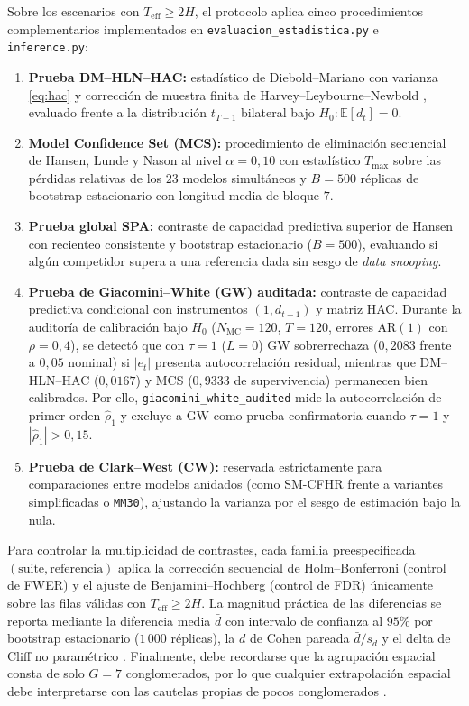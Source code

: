 Sobre los escenarios con $T_{\mathrm{eff}} \ge 2H$, el protocolo aplica cinco procedimientos complementarios implementados en \texttt{evaluacion\_estadistica.py} e \texttt{inference.py}:
\begin{enumerate}
    \item \textbf{Prueba DM--HLN--HAC:} estadístico de Diebold--Mariano \cite{diebold1995} con varianza \eqref{eq:hac} y corrección de muestra finita de Harvey--Leybourne--Newbold \cite{harvey1997}, evaluado frente a la distribución $t_{T-1}$ bilateral bajo $H_0 : \mathbb{E}[d_t] = 0$.
    \item \textbf{Model Confidence Set (MCS):} procedimiento de eliminación secuencial de Hansen, Lunde y Nason \cite{hansen2011mcs} al nivel $\alpha = 0{,}10$ con estadístico $T_{\max}$ sobre las pérdidas relativas de los $23$ modelos simultáneos y $B=500$ réplicas de bootstrap estacionario \cite{politis1994stationary} con longitud media de bloque $7$.
    \item \textbf{Prueba global SPA:} contraste de capacidad predictiva superior de Hansen \cite{hansen2005spa} con recienteo consistente y bootstrap estacionario ($B=500$), evaluando si algún competidor supera a una referencia dada sin sesgo de \textit{data snooping}.
    \item \textbf{Prueba de Giacomini--White (GW) auditada:} contraste de capacidad predictiva condicional \cite{giacomini2006tests} con instrumentos $(1, d_{t-1})$ y matriz HAC. Durante la auditoría de calibración bajo $H_0$ ($N_{\mathrm{MC}} = 120$, $T=120$, errores $\mathrm{AR}(1)$ con $\rho=0{,}4$), se detectó que con $\tau=1$ ($L=0$) GW sobrerrechaza ($0{,}2083$ frente a $0{,}05$ nominal) si $|e_t|$ presenta autocorrelación residual, mientras que DM--HLN--HAC ($0{,}0167$) y MCS ($0{,}9333$ de supervivencia) permanecen bien calibrados. Por ello, \texttt{giacomini\_white\_audited} mide la autocorrelación de primer orden $\hat{\rho}_1$ y excluye a GW como prueba confirmatoria cuando $\tau=1$ y $|\hat{\rho}_1| > 0{,}15$.
    \item \textbf{Prueba de Clark--West (CW):} reservada estrictamente para comparaciones entre modelos anidados \cite{clark2007nested} (como SM-CFHR frente a variantes simplificadas o \texttt{MM30}), ajustando la varianza por el sesgo de estimación bajo la nula.
\end{enumerate}

Para controlar la multiplicidad de contrastes, cada familia preespecificada $(\text{suite}, \text{referencia})$ aplica la corrección secuencial de Holm--Bonferroni \cite{holm1979} (control de FWER) y el ajuste de Benjamini--Hochberg \cite{benjamini1995fdr} (control de FDR) únicamente sobre las filas válidas con $T_{\mathrm{eff}} \ge 2H$. La magnitud práctica de las diferencias se reporta mediante la diferencia media $\bar{d}$ con intervalo de confianza al $95\%$ por bootstrap estacionario ($1\,000$ réplicas), la $d$ de Cohen pareada $\bar{d}/s_d$ y el delta de Cliff no paramétrico \cite{cliff1993dominance}. Finalmente, debe recordarse que la agrupación espacial consta de solo $G=7$ conglomerados, por lo que cualquier extrapolación espacial debe interpretarse con las cautelas propias de pocos conglomerados \cite{cameron2015cluster}.

